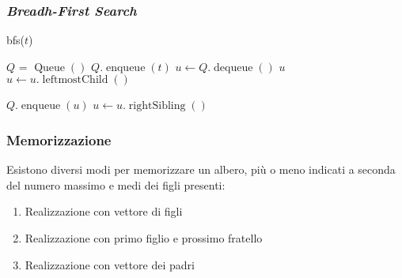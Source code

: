         \subsubsection{\textit{Breadh-First Search}}
            \begin{algorithm}[H]
                \caption{bfs(\Tree $t$)}
                \begin{algorithmic}
                    \State \Queue $Q$ = $\operatorname{Queue}()$
                    \State $Q.\operatorname{enqueue}(t)$
                        \State \Tree $u \gets Q.\operatorname{dequeue}()$
                        \State \Print $u$
                        \State $ u \gets u.\operatorname{leftmostChild}()$
                \end{algorithmic}
            \end{algorithm}
            \begin{algorithm}[H]
                \begin{algorithmic}
                            \State $Q.\operatorname{enqueue}(u)$
                            \State $u \gets u.\operatorname{rightSibling}()$
                        \EndWhile
                    \EndWhile
                \end{algorithmic}
            \end{algorithm}
        \subsubsection{Memorizzazione}
            Esistono diversi modi per memorizzare un albero, più o meno indicati a seconda del numero massimo e medi dei figli presenti:
            \begin{enumerate}
                \item Realizzazione con vettore di figli
                \item Realizzazione con primo figlio e prossimo fratello
                \item Realizzazione con vettore dei padri
            \end{enumerate}


